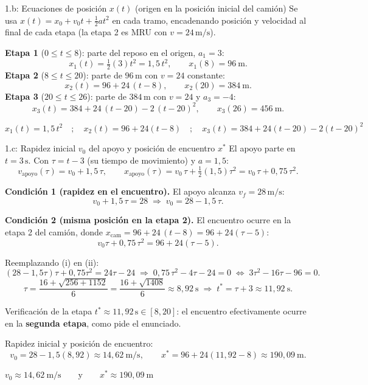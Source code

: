 \documentclass[letterpaper, 11pt]{article}
\begin{document}
\begin{paso}{1.b: Ecuaciones de posici\'on $x(t)$ (origen en la posici\'on inicial del cami\'on)}
Se usa $x(t)=x_0+v_0 t+\tfrac12 a t^2$ en cada tramo, encadenando posici\'on y
velocidad al final de cada etapa (la etapa 2 es MRU con $v=24\,\mathrm{m/s}$).

\textbf{Etapa 1} ($0\le t\le 8$): parte del reposo en el origen, $a_1=3$:
\[
x_1(t)=\tfrac12(3)t^2=1{,}5\,t^2,\qquad x_1(8)=96\ \mathrm{m}.
\]
\textbf{Etapa 2} ($8\le t\le 20$): parte de $96\,\mathrm{m}$ con $v=24$ constante:
\[
x_2(t)=96+24\,(t-8),\qquad x_2(20)=384\ \mathrm{m}.
\]
\textbf{Etapa 3} ($20\le t\le 26$): parte de $384\,\mathrm{m}$ con $v=24$ y $a_3=-4$:
\[
x_3(t)=384+24\,(t-20)-2\,(t-20)^2,\qquad x_3(26)=456\ \mathrm{m}.
\]
\begin{resultado}\centering
$\displaystyle x_1(t)=1{,}5\,t^2\quad;\quad x_2(t)=96+24(t-8)\quad;\quad x_3(t)=384+24(t-20)-2(t-20)^2$
\end{resultado}
\end{paso}

\begin{paso}{1.c: Rapidez inicial $v_0$ del apoyo y posici\'on de encuentro $x^{*}$}
El apoyo parte en $t=3\,\mathrm{s}$. Con $\tau=t-3$ (su tiempo de movimiento) y $a=1{,}5$:
\[
v_{\text{apoyo}}(\tau)=v_0+1{,}5\,\tau,\qquad
x_{\text{apoyo}}(\tau)=v_0\,\tau+\tfrac12(1{,}5)\tau^2=v_0\,\tau+0{,}75\,\tau^2 .
\]

\textbf{Condici\'on 1 (rapidez en el encuentro).} El apoyo alcanza $v_f=28\,\mathrm{m/s}$:
\[
v_0+1{,}5\,\tau=28 \;\Rightarrow\; v_0=28-1{,}5\,\tau. \tag{i}
\]

\textbf{Condici\'on 2 (misma posici\'on en la etapa 2).} El encuentro ocurre en la
etapa 2 del cami\'on, donde $x_{\text{cam}}=96+24\,(t-8)=96+24(\tau-5)$:
\[
v_0\tau+0{,}75\,\tau^2 = 96+24(\tau-5). \tag{ii}
\]

Reemplazando (i) en (ii):
\[
(28-1{,}5\tau)\tau+0{,}75\tau^2 = 24\tau-24
\;\Longrightarrow\; 0{,}75\,\tau^2-4\tau-24=0
\;\Longleftrightarrow\; 3\tau^2-16\tau-96=0.
\]
\[
\tau=\frac{16+\sqrt{256+1152}}{6}=\frac{16+\sqrt{1408}}{6}\approx 8{,}92\ \mathrm{s}
\;\Rightarrow\; t^{*}=\tau+3\approx 11{,}92\ \mathrm{s}.
\]
\begin{justif}{Verificaci\'on de la etapa}
$t^{*}\approx 11{,}92\,\mathrm{s}\in[8,20]$: el encuentro efectivamente ocurre en la
\textbf{segunda etapa}, como pide el enunciado.
\end{justif}

Rapidez inicial y posici\'on de encuentro:
\[
v_0=28-1{,}5(8{,}92)\approx 14{,}62\ \mathrm{m/s},\qquad
x^{*}=96+24(11{,}92-8)\approx 190{,}09\ \mathrm{m}.
\]
\begin{resultado}\centering
$\displaystyle v_0 \approx 14{,}62\ \mathrm{m/s}\qquad\text{y}\qquad x^{*}\approx 190{,}09\ \mathrm{m}$
\end{resultado}
\end{paso}
\end{document}
